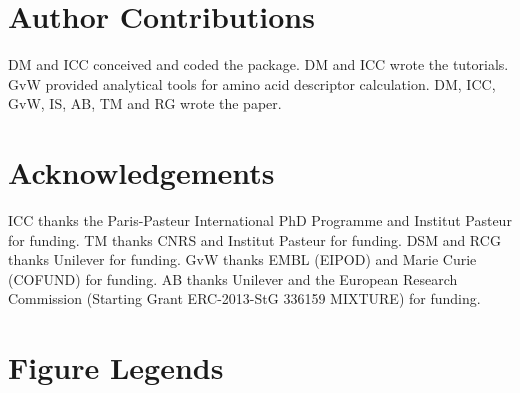 \documentclass[twoside,a4wide,10pt]{article}
\begin{document}
\section*{{\bf Author Contributions}}

DM and ICC conceived and coded the package.
DM and ICC wrote the tutorials.
GvW provided analytical tools for amino acid descriptor calculation.
DM, ICC, GvW, IS, AB, TM and RG wrote the paper.

\section*{{\bf Acknowledgements}}
ICC thanks the Paris-Pasteur International PhD Programme and Institut Pasteur for funding.
TM thanks CNRS and Institut Pasteur for funding.
DSM and RCG thanks Unilever for funding.
GvW thanks EMBL (EIPOD) and Marie Curie (COFUND) for funding.
AB thanks Unilever and the European Research Commission (Starting Grant ERC-2013-StG 336159 MIXTURE) for funding.



\clearpage
\section*{Figure Legends}
\end{document}
